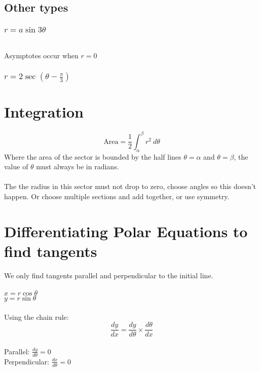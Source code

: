 \documentclass{article}
\begin{document}
\subsection{Other types}
\subsubsection{$r=a\sin3\theta$}
\\
Asymptotes occur when $r=0$
\subsubsection{$r=2\sec(\theta-\frac{\pi}{3})$}
\newpage
\section{Integration}
$$\textrm{Area}=\frac{1}{2}\int^\beta_\alpha r^2 \ d\theta$$
Where the area of the sector is bounded by the half lines $\theta=\alpha$ and $\theta=\beta$, the value of $\theta$ must always be in radians.\\
\\
The the radius in this sector must not drop to zero, choose angles so this doesn't happen. Or choose multiple sections and add together, or use symmetry. 
\section{Differentiating Polar Equations to find tangents}
We only find tangents parallel and perpendicular to the initial line.\\
\\
$x=r\cos\theta$\\
$y=r\sin\theta$\\
\\
Using the chain rule:
$$\frac{dy}{dx}=\frac{dy}{d\theta}\times\frac{d\theta}{dx}$$
\\
Parallel: $\frac{dy}{d\theta}=0$\\
Perpendicular: $\frac{dx}{d\theta}=0$
\end{document}
